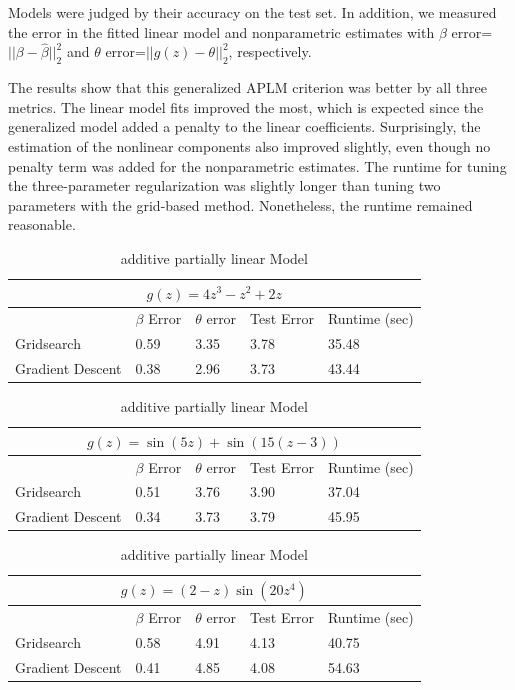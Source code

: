\documentclass[10pt,letterpaper]{article}
\begin{document}
Models were judged by their accuracy on the test set. In addition, we measured the error in the fitted linear model and nonparametric estimates with $\beta$ error=$||\beta - \hat \beta||_2^2$ and $\theta$ error=$|| g(z) - \theta ||_2^2$, respectively.

The results show that this generalized APLM criterion was better by all three metrics. The linear model fits improved the most, which is expected since the generalized model added a penalty to the linear coefficients. Surprisingly, the estimation of the nonlinear components also improved slightly, even though no penalty term was added for the nonparametric estimates. The runtime for tuning the three-parameter regularization was slightly longer than tuning two parameters with the grid-based method. Nonetheless, the runtime remained reasonable.



\begin{table}
\begin{center}
\begin{tabular}{| l | l | l | l | l | }
\hline
\multicolumn{5}{|c|}{$g(z) = 4z^3 - z^2 + 2z$}\\
\hline
 & $\beta$ Error & $\theta$ error & Test Error & Runtime (sec) \\
\hline
Gridsearch & 0.59 & 3.35 & 3.78 & 35.48 \\
\hline
Gradient Descent & 0.38 & 2.96 & 3.73 & 43.44 \\
\hline
\end{tabular}

\begin{tabular}{| l | l | l | l | l | }
\hline
\multicolumn{5}{|c|}{$g(z) = \sin(5z) + \sin(15(z - 3))$}\\
\hline
 & $\beta$ Error & $\theta$ error & Test Error & Runtime (sec) \\
\hline
Gridsearch & 0.51 & 3.76 & 3.90 & 37.04 \\
\hline
Gradient Descent & 0.34 & 3.73 & 3.79 & 45.95 \\
\hline
\end{tabular}

\begin{tabular}{| l | l | l | l | l | }
\hline
\multicolumn{5}{|c|}{$g(z) = (2-z)\sin(20z^4)$}\\
\hline
 & $\beta$ Error & $\theta$ error & Test Error & Runtime (sec) \\
\hline
Gridsearch & 0.58 & 4.91 & 4.13 & 40.75 \\
\hline
Gradient Descent & 0.41 & 4.85 & 4.08 & 54.63 \\
\hline
\end{tabular}
\end{center}
\caption {additive partially linear Model}
\label{ref:aplm}
\end{table}
\end{document}

